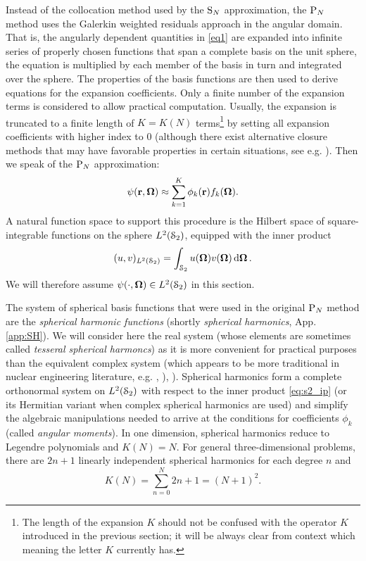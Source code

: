 Instead of the collocation method used by the $\SN$ approximation, the $\PN$ method uses the Galerkin weighted residuals
approach in the angular domain. That is, the angularly dependent quantities in \eqref{eq1} are expanded into infinite
series of properly chosen functions that span a complete basis on the unit sphere, the equation is multiplied by each member of the basis in turn
and integrated over the sphere. The properties of the basis functions are then used to derive equations for
the expansion coefficients. Only a finite number of the expansion terms is considered to allow practical computation.
Usually, the expansion is truncated to a finite length of $K = K(N)$ terms\footnote{The length of the expansion $K$
should not be confused with the operator $K$ introduced in the previous section; it will be always clear from context 
which meaning the letter $K$ currently has.} by setting all expansion coefficients with higher index to 0 (although there exist alternative closure methods that may have favorable properties in certain situations, see e.g.
\cite{Frank0}). Then we speak of the $\PN$ approximation:
\begin{equation}\label{eq1.1}
  \psi(\br,\bomega) \approx \sum_{k=1}^{ K} \phi_k(\br) f_k(\bomega).
\end{equation}
A natural function space to support this procedure is the Hilbert space of 
square-integrable functions on the sphere $\Lp[2](\Sphere)$, equipped with the inner product
\begin{equation}\label{eq:s2_ip}
	(u, v)_{\Lp[2](\Sphere)} = \intA{u(\bomega) {v(\bomega)}}.
\end{equation}
We will therefore assume \mbox{$\psi(\cdot,\bomega)\in\Lp[2](\Sphere)$} in this section. 

The system of spherical basis functions that were used in the original $\PN$ method are the
\textit{spherical harmonic functions} (shortly \textit{spherical harmonics}, App. \ref{app:SH}). We will consider
here the real system (whose elements are sometimes called \textit{tesseral spherical harmoncs}) as it is more convenient
for practical purposes than the equivalent complex system (which appears to be more traditional in nuclear engineering 
literature, e.g. \cite[Sec. 9.7]{Stacey}, \cite[Sec. 14.4]{Reuss}), \cite[Chap. V]{Stammler}). Spherical harmonics form
a complete orthonormal system on $\Lp[2](\Sphere)$ with respect to the inner product \eqref{eq:s2_ip} (or its Hermitian 
variant when complex spherical harmonics are used) and simplify the algebraic manipulations needed to arrive at the 
conditions for coefficients $\phi_k$ (called \textit{angular moments}). In one dimension, spherical harmonics reduce to 
Legendre polynomials and $ K(N) = N$.
For general three-dimensional problems, there are $2n + 1$ linearly independent spherical harmonics for each degree $n$ 
and 
$$ 
	K(N) = \sum_{n=0}^{N} 2n + 1 = (N+1)^2.
$$

